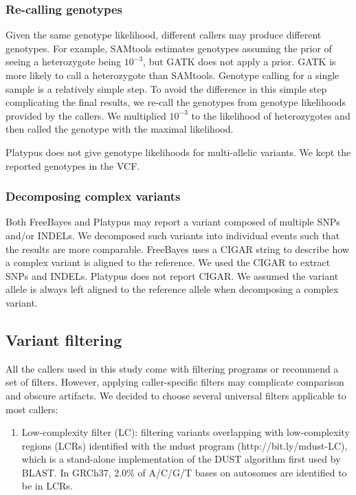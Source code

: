 \documentclass{bioinfo}
\begin{document}
\begin{methods}
\subsubsection{Re-calling genotypes} Given the same genotype likelihood,
different callers may produce different genotypes. For example, SAMtools
estimates genotypes assuming the prior of seeing a heterozygote being $10^{-3}$,
but GATK does not apply a prior. GATK is more likely to call a heterozygote
than SAMtools. Genotype calling for a single sample is a relatively simple
step. To avoid the difference in this simple step complicating the final
results, we re-call the genotypes from genotype likelihoods provided by the
callers.  We multiplied $10^{-3}$ to the likelihood of heterozygotes and then
called the genotype with the maximal likelihood.

Platypus does not give genotype likelihoods for multi-allelic variants. We
kept the reported genotypes in the VCF.

\subsubsection{Decomposing complex variants} Both FreeBayes and Platypus may
report a variant composed of multiple SNPs and/or INDELs. We decomposed such
variants into individual events such that the results are more comparable.
FreeBayes uses a CIGAR string to describe how a complex variant is aligned to
the reference. We used the CIGAR to extract SNPs and INDELs. Platypus does not
report CIGAR. We assumed the variant allele is always left aligned to the
reference allele when decomposing a complex variant.

\subsection{Variant filtering}\label{sec:flt}

All the callers used in this study come with filtering programs or recommend a
set of filters. However, applying caller-specific filters may complicate
comparison and obscure artifacts. We decided to choose several universal
filters applicable to most callers:

\begin{enumerate}

\item Low-complexity filter (LC): filtering variants overlapping with
low-complexity regions (LCRs) identified with the mdust program
(http://bit.ly/mdust-LC), which is a stand-alone implementation of the DUST
algorithm first used by BLAST. In GRCh37, 2.0\% of A/C/G/T bases on autosomes
are identified to be in LCRs.


\end{enumerate}
\end{methods}
\end{document}
